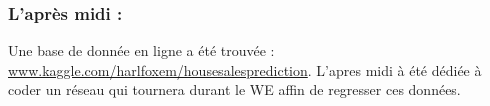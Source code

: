 \subsubsection*{L'après midi :}

Une base de donnée en ligne a été trouvée : \url{www.kaggle.com/harlfoxem/housesalesprediction}.
L'apres midi à été dédiée à coder un réseau qui tournera durant le WE affin de regresser ces données.
